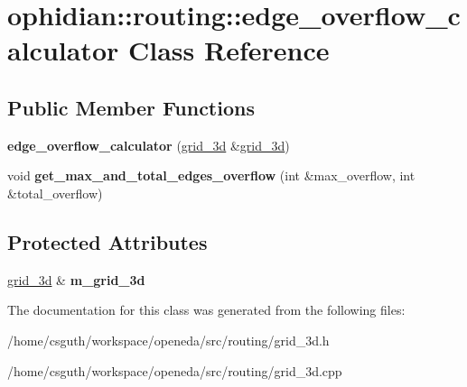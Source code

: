 \hypertarget{classophidian_1_1routing_1_1edge__overflow__calculator}{\section{ophidian\-:\-:routing\-:\-:edge\-\_\-overflow\-\_\-calculator Class Reference}
\label{classophidian_1_1routing_1_1edge__overflow__calculator}
}
\subsection*{Public Member Functions}
\begin{DoxyCompactItemize}
\item 
\hypertarget{classophidian_1_1routing_1_1edge__overflow__calculator_a9f43c21e052c4fb7fc1132ad5bae745e}{{\bfseries edge\-\_\-overflow\-\_\-calculator} (\hyperlink{classophidian_1_1routing_1_1grid__3d}{grid\-\_\-3d} \&\hyperlink{classophidian_1_1routing_1_1grid__3d}{grid\-\_\-3d})}\label{classophidian_1_1routing_1_1edge__overflow__calculator_a9f43c21e052c4fb7fc1132ad5bae745e}

\item 
\hypertarget{classophidian_1_1routing_1_1edge__overflow__calculator_ab798904529be65b354e6a1b26640693c}{void {\bfseries get\-\_\-max\-\_\-and\-\_\-total\-\_\-edges\-\_\-overflow} (int \&max\-\_\-overflow, int \&total\-\_\-overflow)}\label{classophidian_1_1routing_1_1edge__overflow__calculator_ab798904529be65b354e6a1b26640693c}

\end{DoxyCompactItemize}
\subsection*{Protected Attributes}
\begin{DoxyCompactItemize}
\item 
\hypertarget{classophidian_1_1routing_1_1edge__overflow__calculator_ae90e943ddff26de98de8e8fe71348ef5}{\hyperlink{classophidian_1_1routing_1_1grid__3d}{grid\-\_\-3d} \& {\bfseries m\-\_\-grid\-\_\-3d}}\label{classophidian_1_1routing_1_1edge__overflow__calculator_ae90e943ddff26de98de8e8fe71348ef5}

\end{DoxyCompactItemize}


The documentation for this class was generated from the following files\-:\begin{DoxyCompactItemize}
\item 
/home/csguth/workspace/openeda/src/routing/grid\-\_\-3d.\-h\item 
/home/csguth/workspace/openeda/src/routing/grid\-\_\-3d.\-cpp\end{DoxyCompactItemize}
